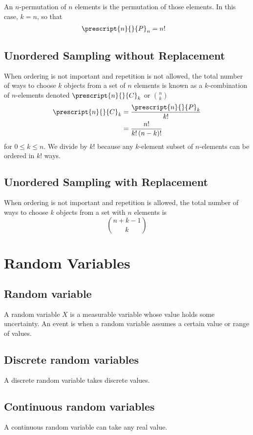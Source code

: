 \documentclass{article}
\begin{document}
\begin{multicols}{3}
    An \(n\)-permutation of \(n\) elements is the permutation of those elements.
    In this case, \(k = n\), so that
    \begin{align*}
        \prescript{n}{}{P}_n & = n!
    \end{align*}
    \subsection{Unordered Sampling without Replacement}
    When ordering is not important and repetition is not allowed,
    the total number of ways to choose \(k\) objects from a set of \(n\) elements is
    known as a \(k\)-combination of \(n\)-elements denoted \(\prescript{n}{}{C}_k\) or \(\binom{n}{k}\)
    \begin{align*}
        \prescript{n}{}{C}_k & = \frac{\prescript{n}{}{P}_k}{k!}     \\
                             & = \frac{n!}{k! \left( n - k \right)!}
    \end{align*}
    for \(0 \leq k \leq n\). We divide by \(k!\) because any \(k\)-element subset of \(n\)-elements %
    can be ordered in \(k!\) ways. %
    \subsection{Unordered Sampling with Replacement}
    When ordering is not important and repetition is allowed,
    the total number of ways to choose \(k\) objects from a set with \(n\) elements is
    \begin{equation*}
        \binom{n + k - 1}{k}
    \end{equation*}
    \section{Random Variables}
    \subsection{Random variable}
    A random variable \(X\) is a measurable variable whose value holds some uncertainty.
    An event is when a random variable assumes a certain value or range of values.
    \subsection{Discrete random variables}
    A discrete random variable takes discrete values.
    \subsection{Continuous random variables}
    A continuous random variable can take any real value.

\end{multicols}
\end{document}
